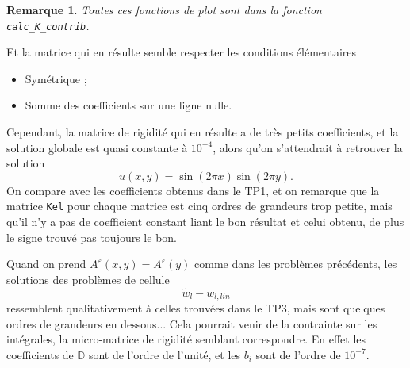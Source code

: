 \documentclass[11pt]{article}
\newtheorem{rmq}{Remarque}
\newcommand{\D}{\mathbb{D}}
\newcommand{\tw}{\tilde{w}}
\newcommand{\Ae}{A^\varepsilon}
\begin{document}
\begin{rmq}
  Toutes ces fonctions de plot sont dans la fonction \texttt{calc\_K\_contrib}.
\end{rmq}

Et la matrice qui en résulte semble respecter les conditions élémentaires
\begin{itemize}
\item Symétrique ;
\item Somme des coefficients sur une ligne nulle.
\end{itemize}
Cependant, la matrice de rigidité qui en résulte a de très petits coefficients, et la solution globale est quasi constante à $10^{-4}$, alors qu'on
s'attendrait à retrouver la solution
\[
  u(x, y) = \sin(2\pi x )\sin(2\pi y).
\]
On compare avec les coefficients obtenus dans le TP1, et on remarque que la matrice \texttt{Kel} pour chaque matrice est cinq ordres de grandeurs trop
petite, mais qu'il n'y a pas de coefficient constant liant le bon résultat et celui obtenu, de plus le signe trouvé pas toujours le bon.

Quand on prend $\Ae(x, y)=\Ae(y)$ comme dans les problèmes précédents, les solutions des problèmes de cellule
\[
  \tw_l - w_{l, lin}
\]
ressemblent qualitativement à celles trouvées dans le TP3, mais sont quelques ordres de grandeurs en dessous... Cela pourrait venir de la contrainte
sur les intégrales, la micro-matrice de rigidité semblant correspondre. En effet les coefficients de $\D$ sont de l'ordre de l'unité, et les $b_i$ sont
de l'ordre de $10^{-7}$.
\end{document}
